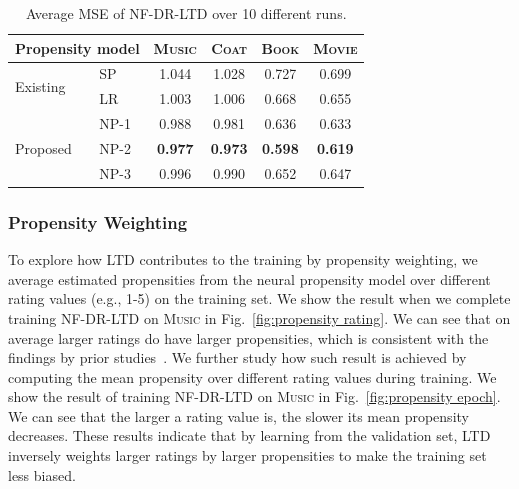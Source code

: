 \documentclass[letterpaper]{article} %
\begin{document}
\begin{table}[tbp]
\small
\centering
\caption{Average MSE of NF-DR-LTD over 10 different runs.}
\label{tab:mse ablation studies}
\begin{tabular}{l|l|cc||cc}
\toprule
\multicolumn{2}{c|}{Propensity model} & \textsc{Music} & \textsc{Coat} & \textsc{Book} & \textsc{Movie} \\
\midrule
\multirow{2}{*}{Existing} & SP & 1.044 & 1.028 & 0.727 & 0.699 \\
& LR & 1.003 & 1.006 & 0.668 & 0.655 \\
\midrule
\multirow{3}{*}{Proposed} & NP-1 & 0.988 & 0.981 & 0.636 & 0.633 \\
& NP-2 & \textbf{0.977} & \textbf{0.973} & \textbf{0.598} & \textbf{0.619} \\
& NP-3 & 0.996 & 0.990 & 0.652 & 0.647 \\
\bottomrule
\end{tabular}
\end{table}

\subsubsection{Propensity Weighting}
To explore how LTD contributes to the training by propensity weighting, we average estimated propensities from the neural propensity model over different rating values (e.g., 1-5) on the training set.
We show the result when we complete training NF-DR-LTD on \textsc{Music} in Fig.~\ref{fig:propensity rating}.
We can see that on average larger ratings do have larger propensities, which is consistent with the findings by prior studies~\cite{marlin2007collaborative}.
We further study how such result is achieved by computing the mean propensity over different rating values during training.
We show the result of training NF-DR-LTD on \textsc{Music} in Fig.~\ref{fig:propensity epoch}.
We can see that the larger a rating value is, the slower its mean propensity decreases.
These results indicate that by learning from the validation set, LTD inversely weights larger ratings by larger propensities to make the training set less biased.
\end{document}

